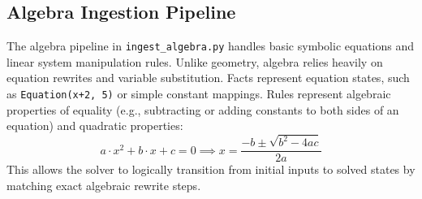 \subsection{Algebra Ingestion Pipeline}
The algebra pipeline in \texttt{ingest\_algebra.py} handles basic symbolic equations and linear system manipulation rules. Unlike geometry, algebra relies heavily on equation rewrites and variable substitution. Facts represent equation states, such as \texttt{Equation(x+2, 5)} or simple constant mappings. Rules represent algebraic properties of equality (e.g., subtracting or adding constants to both sides of an equation) and quadratic properties:
\begin{equation}
    a \cdot x^2 + b \cdot x + c = 0 \implies x = \frac{-b \pm \sqrt{b^2 - 4ac}}{2a}
\end{equation}
This allows the solver to logically transition from initial inputs to solved states by matching exact algebraic rewrite steps.
